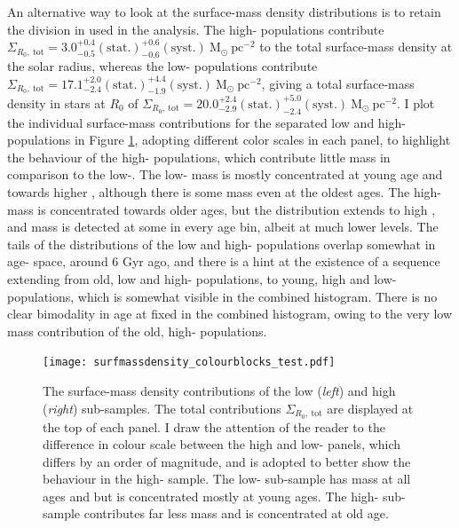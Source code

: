 An alternative way to look at the surface-mass density distributions is to retain the division in \afe{} used in the analysis. The high-\afe{} populations contribute $\Sigma_{R_0,\ \mathrm{tot}} = 3.0_{-0.5}^{+0.4}\mathrm{(stat.)}_{-0.6}^{+0.6}\mathrm{(syst.)}\ \mathrm{M_{\odot}\ pc^{-2}}$ to the total surface-mass density at the solar radius, whereas the low-\afe{} populations contribute $\Sigma_{R_0,\ \mathrm{tot}} = 17.1_{-2.4}^{+2.0}\mathrm{(stat.)}_{-1.9}^{+4.4}\mathrm{(syst.)}\ \mathrm{M_{\odot}\ pc^{-2}}$, giving a total surface-mass density in stars at $R_0$ of $\Sigma_{R_0,\ \mathrm{tot}} = 20.0_{-2.9}^{+2.4}\mathrm{(stat.)}_{-2.4}^{+5.0}\mathrm{(syst.)}\ \mathrm{M_{\odot}\ pc^{-2}}$. I plot the individual surface-mass contributions for the separated low and high-\afe{} populations in Figure \ref{fig:massafe}, adopting different color scales in each panel, to highlight the behaviour of the high-\afe{} populations, which contribute little mass in comparison to the low-\afe{}. The low-\afe{} mass is mostly concentrated at young age and towards higher \feh{}, although there is some mass even at the oldest ages. The high-\afe{} mass is concentrated towards older ages, but the distribution extends to high \feh{}, and mass is detected at some \feh{} in every age bin, albeit at much lower levels. The tails of the distributions of the low and high-\afe{} populations overlap somewhat in age-\feh{} space, around 6 Gyr ago, and there is a hint at the existence of a sequence extending from old, low \feh{} and high-\afe{} populations, to young, high \feh{} and low-\afe{} populations, which is somewhat visible in the combined histogram. There is no clear bimodality in age at fixed \feh{} in the combined histogram, owing to the very low mass contribution of the old, high-\afe{} populations. 

\begin{figure}
\texttt{[image: surfmassdensity\_colourblocks\_test.pdf]}
 	\centering
     \caption[The separated surface mass density contributions of mono-age, mono-\feh{} populations in the low and high-\afe{} populations]{The surface-mass density contributions of the low (\emph{left}) and high (\emph{right}) \afe{} sub-samples. The total contributions $\Sigma_{R_0,\ \mathrm{tot}}$ are displayed at the top of each panel. I draw the attention of the reader to the difference in colour scale between the high and low-\afe{} panels, which differs by an order of magnitude, and is adopted to better show the behaviour in the high-\afe{} sample. The low-\afe{} sub-sample has mass at all ages and \feh{} but is concentrated mostly at young ages. The high-\afe{} sub-sample contributes far less mass and is concentrated at old age.}
     \label{fig:massafe}
\end{figure}



